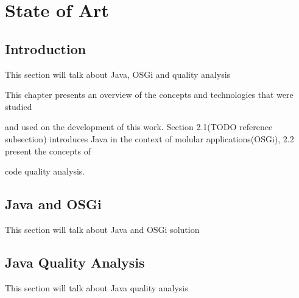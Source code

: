 \chapter{State of Art}

\section{Introduction}
This section will talk about Java, OSGi and quality analysis

This chapter presents an overview of the concepts and technologies that were studied

and used on the development of this work. Section 2.1(TODO reference subsection) introduces Java in the context of molular applications(OSGi), 2.2 present the concepts of

code quality analysis.  

\section{Java and OSGi}
This section will talk about Java and OSGi solution

\section{Java Quality Analysis}
This section will talk about Java quality analysis

